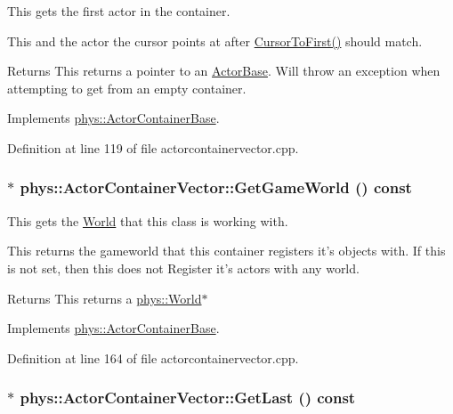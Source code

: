This gets the first actor in the container. 

This and the actor the cursor points at after \hyperlink{classphys_1_1ActorContainerVector_ad9c2eb2a9405dcf687c86745afc9c031}{CursorToFirst()} should match. \begin{DoxyReturn}{Returns}
This returns a pointer to an \hyperlink{classphys_1_1ActorBase}{ActorBase}. Will throw an exception when attempting to get from an empty container. 
\end{DoxyReturn}


Implements \hyperlink{classphys_1_1ActorContainerBase_ae703482d84a9c6726e28a8f26418b161}{phys::ActorContainerBase}.



Definition at line 119 of file actorcontainervector.cpp.

\hypertarget{classphys_1_1ActorContainerVector_a5519eb0000073a2f397e158bfc368349}{
\subsubsection[{GetGameWorld}]{ $\ast$ phys::ActorContainerVector::GetGameWorld () const}}
\label{d3/d64/classphys_1_1ActorContainerVector_a5519eb0000073a2f397e158bfc368349}


This gets the \hyperlink{classphys_1_1World}{World} that this class is working with. 

This returns the gameworld that this container registers it's objects with. If this is not set, then this does not Register it's actors with any world. \begin{DoxyReturn}{Returns}
This returns a \hyperlink{classphys_1_1World}{phys::World}$\ast$ 
\end{DoxyReturn}


Implements \hyperlink{classphys_1_1ActorContainerBase_a479e6c7434f2611b0cfe6ca1fd4ebdd1}{phys::ActorContainerBase}.



Definition at line 164 of file actorcontainervector.cpp.

\hypertarget{classphys_1_1ActorContainerVector_a211f6e419ef0b753cecf2c662a54511e}{
\subsubsection[{GetLast}]{ $\ast$ phys::ActorContainerVector::GetLast () const}}
\label{d3/d64/classphys_1_1ActorContainerVector_a211f6e419ef0b753cecf2c662a54511e}


